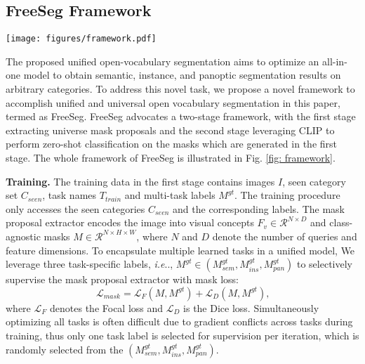 \documentclass[10pt,twocolumn,letterpaper]{article}
\makeatletter
\DeclareRobustCommand\onedot{\futurelet\@let@token\@onedot}
\def\@onedot{\ifx\@let@token.\else.\null\fi\xspace}
\def\ie{\emph{i.e}\onedot} \def\Ie{\emph{I.e}\onedot}
\makeatother
\begin{document}
\subsection{FreeSeg Framework}

\begin{figure*}[t]
    \centering
    \begin{center}
        \texttt{[image: figures/framework.pdf]}
    \end{center}
        \vspace{-20pt}
    \caption{ Overview of our two-stage FreeSeg framework. 
i) one-shot training: optimizes an all-in-one segmentation model via multi-task supervision to generate universal mask proposals; ii) Multi-task inference: leverages pre-trained CLIP to classify mask proposals according to adaptive task and class prompt.}
    \label{fig: framework}
    \vspace{-5pt}
    \end{figure*}


The proposed unified open-vocabulary segmentation aims to optimize an all-in-one model to obtain semantic, instance, and panoptic segmentation results on arbitrary categories.
To address this novel task,  we propose a novel framework to accomplish unified and universal open vocabulary segmentation in this paper, termed as FreeSeg.
FreeSeg advocates a two-stage framework, with the first stage extracting universe mask proposals and the second stage leveraging CLIP to perform zero-shot classification on the masks which are generated in the first stage. The whole framework of FreeSeg is illustrated in Fig. \ref{fig: framework}.

\textbf{Training.} The training data in the first stage
contains images $I$, seen category set $C_{seen}$, task names $T_{train}$ and multi-task labels $M^{gt}$. 
The training procedure only accesses the seen categories $C_{seen}$ and the corresponding labels.
The mask proposal extractor encodes the image into visual concepts $F_v \in \mathcal{R}^{N \times D}$ and class-agnostic masks $M \in \mathcal{R}^{N \times H \times W}$, where $N$ and $D$ denote the number of queries and feature dimensions. 
To encapsulate multiple learned tasks in a unified model, We leverage three task-specific labels, \ie, $M^{gt}\in (M^{gt}_{sem}, M^{gt}_{ins}, M^{gt}_{pan})$ to selectively supervise the mask proposal extractor with mask loss:
\begin{equation}
 \mathcal{L}_{mask} = \mathcal{L}_F(M, M^{gt}) + \mathcal{L}_D(M, M^{gt})
\text{,} 
    \end{equation}
where $\mathcal{L}_F$ denotes the Focal\cite{lin2017focal} loss and $\mathcal{L}_D$ is the Dice\cite{milletari2016v} loss. 
Simultaneously optimizing all tasks is often difficult due to gradient conflicts across tasks during training, thus only one task label is selected for supervision per iteration, which is randomly selected from the $(M^{gt}_{sem}, M^{gt}_{ins}, M^{gt}_{pan})$.
\end{document}
